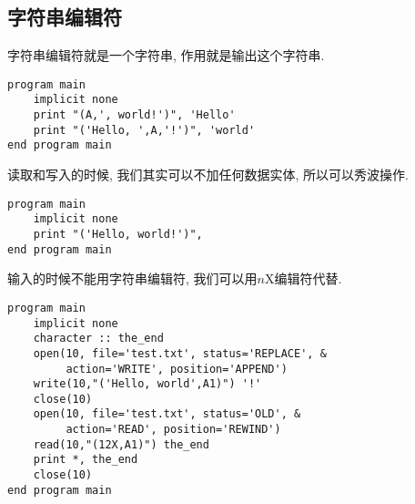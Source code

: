 \subsection{字符串编辑符}\label{character_string_edit_descriptor}

字符串编辑符就是一个字符串, 作用就是输出这个字符串.
\begin{verbatim}
program main
    implicit none
    print "(A,', world!')", 'Hello'
    print "('Hello, ',A,'!')", 'world'
end program main
\end{verbatim}
读取和写入的时候, 我们其实可以不加任何数据实体, 所以可以秀波操作.
\begin{verbatim}
program main
    implicit none
    print "('Hello, world!')",
end program main
\end{verbatim}
输入的时候不能用字符串编辑符, 我们可以用$n$X编辑符代替.
\begin{verbatim}
program main
    implicit none
    character :: the_end
    open(10, file='test.txt', status='REPLACE', &
         action='WRITE', position='APPEND')
    write(10,"('Hello, world',A1)") '!'
    close(10)
    open(10, file='test.txt', status='OLD', &
         action='READ', position='REWIND')
    read(10,"(12X,A1)") the_end
    print *, the_end
    close(10)
end program main
\end{verbatim}
